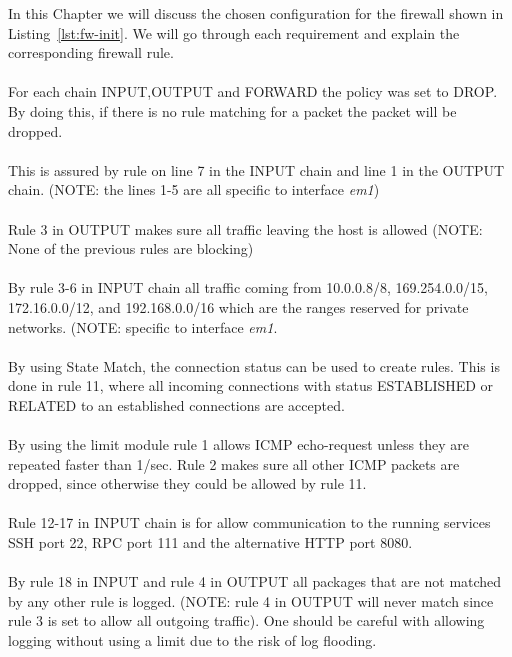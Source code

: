 \documentclass[a4paper,12pt]{report}
\begin{document}
In this Chapter we will discuss the chosen configuration for the firewall shown in Listing~\ref{lst:fw-init}. We will go through each requirement and explain the corresponding firewall rule.
\\\\
For each chain INPUT,OUTPUT and FORWARD the policy was set to DROP. By doing this, if there is no rule matching for a packet the packet will be dropped.
\\\\
This is assured by rule on line 7 in the INPUT chain and line 1 in the OUTPUT chain. (NOTE: the lines 1-5 are all specific to interface \emph{em1})
\\\\
Rule 3 in OUTPUT makes sure all traffic leaving the host is allowed (NOTE: None of the previous rules are blocking)
\\\\
By rule 3-6 in INPUT chain all traffic coming from 10.0.0.8/8, 169.254.0.0/15, 172.16.0.0/12, and 192.168.0.0/16 which are the ranges reserved for private networks. (NOTE: specific to interface \emph{em1}.
\\\\
By using State Match, the connection status can be used to create rules. This is done in rule 11, where all incoming connections with status ESTABLISHED or RELATED to an established connections are accepted.
\\\\
By using the limit module rule 1 allows ICMP echo-request unless they are repeated faster than 1/sec. Rule 2 makes sure all other ICMP packets are dropped, since otherwise they could be allowed by rule 11.
\\\\
Rule 12-17 in INPUT chain is for allow communication to the running services SSH port 22, RPC port 111 and the alternative HTTP port 8080.
\\\\
By rule 18 in INPUT and rule 4 in OUTPUT all packages that are not matched by any other rule is logged. (NOTE: rule 4 in OUTPUT will never match since rule 3 is set to allow all outgoing traffic). One should be careful with allowing logging without using a limit due to the risk of log flooding.
\end{document}
